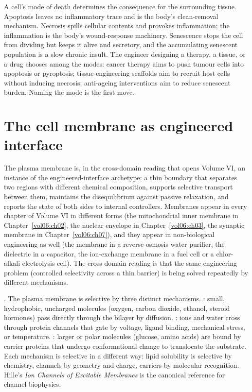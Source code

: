 \begin{principle}
A cell's mode of death determines the consequence for the surrounding
tissue. Apoptosis leaves no inflammatory trace and is the body's
clean-removal mechanism. Necrosis spills cellular contents and
provokes inflammation; the inflammation is the body's wound-response
machinery. Senescence stops the cell from dividing but keeps it alive
and secretory, and the accumulating senescent population is a slow
chronic insult. The engineer designing a therapy, a tissue, or a drug
chooses among the modes: cancer therapy aims to push tumour cells
into apoptosis or pyroptosis; tissue-engineering scaffolds aim to
recruit host cells without inducing necrosis; anti-ageing
interventions aim to reduce senescent burden. Naming the mode is the
first move.
\end{principle}

\section{The cell membrane as engineered interface}

The plasma membrane is, in the cross-domain reading that opens
Volume VI, an instance of the engineered-interface archetype: a thin
boundary that separates two regions with different chemical
composition, supports selective transport between them, maintains the
disequilibrium against passive relaxation, and reports the state of
both sides to internal controllers. Membranes appear in every chapter
of Volume VI in different forms (the mitochondrial inner membrane in
Chapter~\ref{vol06:ch02}, the nuclear envelope in Chapter~\ref{vol06:ch03},
the synaptic membrane in Chapter~\ref{vol06:ch07}), and they
appear in non-biological engineering as well (the membrane in a
reverse-osmosis water purifier, the dielectric in a capacitor, the
ion-exchange membrane in a fuel cell or a chlor-alkali electrolysis
cell). The cross-domain reading is that the same engineering
problem (controlled selectivity across a thin barrier) is being
solved repeatedly by different mechanisms.

. The plasma membrane is selective by
three distinct mechanisms. : small,
hydrophobic, uncharged molecules (oxygen, carbon dioxide, ethanol,
steroid hormones) pass directly through the bilayer by diffusion.
: ions and water cross through
protein channels that gate by voltage, ligand binding, mechanical
stress, or temperature. : larger
or polar molecules (glucose, amino acids) are bound by carrier
proteins that undergo conformational change to translocate the
substrate. Each mechanism is selective in a different way: lipid
solubility is selective by chemistry, channels by geometry and charge,
carriers by molecular recognition. Hille's \emph{Ion Channels of
Excitable Membranes} \cite{text:v6c01-hille-channels-2001} is the
canonical reference for channel biophysics.

